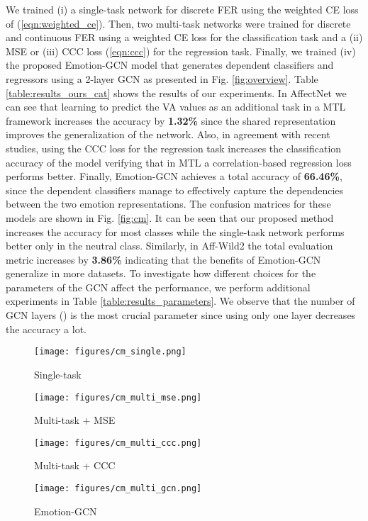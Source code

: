 \documentclass[a4paper, 10pt, conference]{ieeeconf}      \usepackage{FG2021}
\begin{document}
We trained (i) a single-task network for discrete FER using the weighted CE loss of (\ref{eqn:weighted_ce}). Then, two multi-task networks were trained for discrete and continuous FER using a weighted CE loss for the classification task and a (ii) MSE or (iii) CCC loss (\ref{eqn:ccc}) for the regression task. Finally, we trained (iv) the proposed Emotion-GCN model that generates dependent classifiers and regressors using a 2-layer GCN as presented in Fig. \ref{fig:overview}. Table \ref{table:results_ours_cat} shows the results of our experiments. In AffectNet we can see that learning to predict the VA values as an additional task in a MTL framework increases the accuracy by \textbf{1.32\%} since the shared representation improves the generalization of the network. Also, in agreement with recent studies, using the CCC loss for the regression task increases the classification accuracy of the model verifying that in MTL a correlation-based regression loss performs better. Finally, Emotion-GCN achieves a total accuracy of \textbf{66.46\%}, since the dependent classifiers manage to effectively capture the dependencies between the two emotion representations. The confusion matrices for these models are shown in Fig. \ref{fig:cm}. It can be seen that our proposed method increases the accuracy for most classes while the single-task network performs better only in the neutral class. Similarly, in Aff-Wild2 the total evaluation metric increases by \textbf{3.86\%} indicating that the benefits of Emotion-GCN generalize in more datasets. To investigate  how different choices for the parameters of the GCN affect the performance, we perform additional experiments in Table \ref{table:results_parameters}. We observe that the number of GCN layers () is the most crucial parameter since using only one layer decreases the accuracy a lot.

\begin{figure*}[t]
     \centering
     \begin{subfigure}[b]{0.24\textwidth}
         \centering
         \texttt{[image: figures/cm\_single.png]}
         \caption{Single-task}
         \label{fig:cm_single}
     \end{subfigure}
     \hfill
     \begin{subfigure}[b]{0.24\textwidth}
         \centering
         \texttt{[image: figures/cm\_multi\_mse.png]}
         \caption{Multi-task + MSE}
         \label{fig:cm_multi_mse}
    \end{subfigure}
     \hfill
     \begin{subfigure}[b]{0.24\textwidth}
         \centering
         \texttt{[image: figures/cm\_multi\_ccc.png]}
         \caption{Multi-task + CCC}
         \label{fig:cm_multi_ccc}
     \end{subfigure}
     \hfill
     \begin{subfigure}[b]{0.24\textwidth}
         \centering
         \texttt{[image: figures/cm\_multi\_gcn.png]}
         \caption{Emotion-GCN}
         \label{fig:cm_multi_gcn}
    \end{subfigure}
    \caption{Confusion matrices of our models on the validation set of AffectNet.}
    \label{fig:cm}
\end{figure*}
\end{document}

